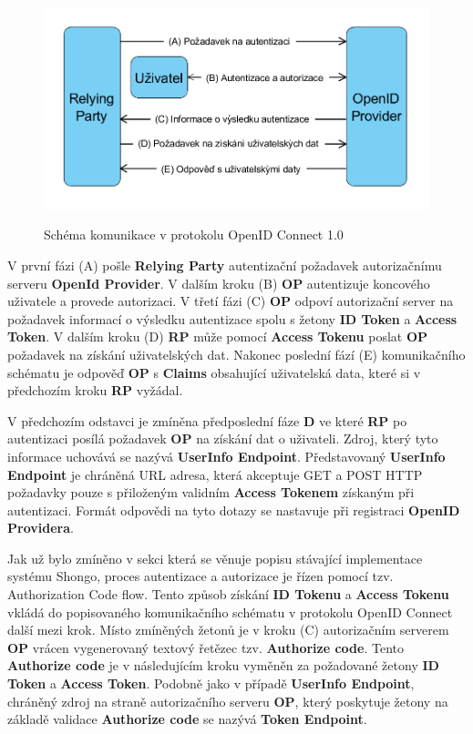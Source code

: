 \documentclass[
  printed, %
  twoside, %
  table,   %
  nolof,     %
  nolot,     %
]{fithesis3}
\begin{document}
\begin{figure}[H]
\caption{Schéma komunikace v protokolu OpenID Connect 1.0}
\centering
\includegraphics[width=12.8cm]{pics/diplomkaOIDC} 
\label{fig:oidc}
\end{figure}
\par 

V první fázi (A) pošle \textbf{Relying Party} autentizační požadavek autorizačnímu serveru \textbf{OpenId Provider}. V dalším kroku (B) \textbf{OP} autentizuje koncového uživatele a provede autorizaci. V třetí fázi (C) \textbf{OP} odpoví autorizační server na požadavek informací o výsledku autentizace spolu s žetony \textbf{ID Token} a \textbf{Access Token}. V dalším kroku (D) \textbf{RP} může pomocí \textbf{Access Tokenu} poslat \textbf{OP} požadavek na získání uživatelských dat. Nakonec poslední fází (E) komunikačního schématu je odpověď \textbf{OP} s \textbf{Claims} obsahující uživatelská data, které si v předchozím kroku \textbf{RP} vyžádal. \par

V předchozím odstavci je zmíněna předposlední fáze \textbf{D} ve které \textbf{RP} po autentizaci posílá požadavek \textbf{OP} na získání dat o uživateli. Zdroj, který tyto informace uchovává se nazývá \textbf{UserInfo Endpoint}. Představovaný \textbf{UserInfo Endpoint} je chráněná URL adresa, která akceptuje GET a POST HTTP požadavky pouze s přiloženým validním \textbf{Access Tokenem} získaným při autentizaci. Formát odpovědi na tyto dotazy se nastavuje při registraci \textbf{OpenID Providera}.  \par

Jak už bylo zmíněno v sekci která se věnuje popisu stávající implementace systému Shongo, proces autentizace a autorizace je řízen pomocí tzv. Authorization Code flow. Tento způsob získání \textbf{ID Tokenu} a \textbf{Access Tokenu} vkládá do popisovaného komunikačního schématu v protokolu OpenID Connect další mezi krok. Místo zmíněných žetonů je v kroku (C) autorizačním serverem \textbf{OP} vrácen vygenerovaný textový řetězec tzv. \textbf{Authorize code}. Tento \textbf{Authorize code} je v následujícím kroku vyměněn za požadované žetony \textbf{ID Token} a \textbf{Access Token}. Podobně jako v případě \textbf{UserInfo Endpoint}, chráněný zdroj na straně autorizačního serveru \textbf{OP}, který poskytuje žetony na základě validace \textbf{Authorize code} se nazývá \textbf{Token Endpoint}.
\end{document}
